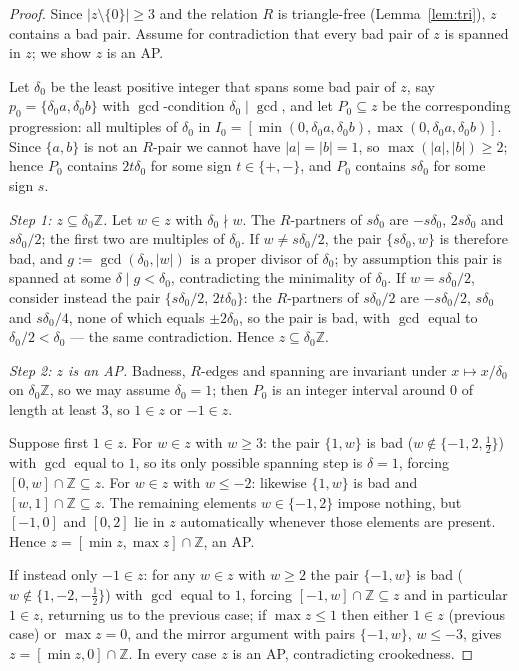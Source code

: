 \documentclass[11pt]{article}
\theoremstyle{definition}
\newcommand{\Z}{\mathbb{Z}}
\begin{document}
\begin{proof}
Since $|z\setminus\{0\}|\ge 3$ and the relation $R$ is triangle-free (Lemma~\ref{lem:tri}), $z$ contains a bad pair. Assume for contradiction that every bad pair of $z$ is spanned in $z$; we show $z$ is an AP.

Let $\delta_0$ be the least positive integer that spans some bad pair of $z$, say $p_0=\{\delta_0 a,\delta_0 b\}$ with $\gcd$-condition $\delta_0\mid\gcd$, and let $P_0\subseteq z$ be the corresponding progression: all multiples of $\delta_0$ in $I_0=[\min(0,\delta_0a,\delta_0b),\max(0,\delta_0a,\delta_0b)]$. Since $\{a,b\}$ is not an $R$-pair we cannot have $|a|=|b|=1$, so $\max(|a|,|b|)\ge2$; hence $P_0$ contains $2t\delta_0$ for some sign $t\in\{+,-\}$, and $P_0$ contains $s\delta_0$ for some sign $s$.

\emph{Step 1: $z\subseteq\delta_0\mathbb{Z}$.} Let $w\in z$ with $\delta_0\nmid w$. The $R$-partners of $s\delta_0$ are $-s\delta_0$, $2s\delta_0$ and $s\delta_0/2$; the first two are multiples of $\delta_0$. If $w\neq s\delta_0/2$, the pair $\{s\delta_0,w\}$ is therefore bad, and $g:=\gcd(\delta_0,|w|)$ is a proper divisor of $\delta_0$; by assumption this pair is spanned at some $\delta\mid g<\delta_0$, contradicting the minimality of $\delta_0$. If $w=s\delta_0/2$, consider instead the pair $\{s\delta_0/2,\,2t\delta_0\}$: the $R$-partners of $s\delta_0/2$ are $-s\delta_0/2$, $s\delta_0$ and $s\delta_0/4$, none of which equals $\pm2\delta_0$, so the pair is bad, with $\gcd$ equal to $\delta_0/2<\delta_0$ --- the same contradiction. Hence $z\subseteq\delta_0\mathbb{Z}$.

\emph{Step 2: $z$ is an AP.} Badness, $R$-edges and spanning are invariant under $x\mapsto x/\delta_0$ on $\delta_0\mathbb{Z}$, so we may assume $\delta_0=1$; then $P_0$ is an integer interval around $0$ of length at least $3$, so $1\in z$ or $-1\in z$.

Suppose first $1\in z$. For $w\in z$ with $w\ge3$: the pair $\{1,w\}$ is bad ($w\notin\{-1,2,\tfrac12\}$) with $\gcd$ equal to $1$, so its only possible spanning step is $\delta=1$, forcing $[0,w]\cap\Z\subseteq z$. For $w\in z$ with $w\le-2$: likewise $\{1,w\}$ is bad and $[w,1]\cap\Z\subseteq z$. The remaining elements $w\in\{-1,2\}$ impose nothing, but $[-1,0]$ and $[0,2]$ lie in $z$ automatically whenever those elements are present. Hence $z=[\min z,\max z]\cap\Z$, an AP.

If instead only $-1\in z$: for any $w\in z$ with $w\ge 2$ the pair $\{-1,w\}$ is bad ($w\notin\{1,-2,-\tfrac12\}$) with $\gcd$ equal to $1$, forcing $[-1,w]\cap\Z\subseteq z$ and in particular $1\in z$, returning us to the previous case; if $\max z\le 1$ then either $1\in z$ (previous case) or $\max z=0$, and the mirror argument with pairs $\{-1,w\}$, $w\le-3$, gives $z=[\min z,0]\cap\Z$. In every case $z$ is an AP, contradicting crookedness.
\end{proof}
\end{document}
